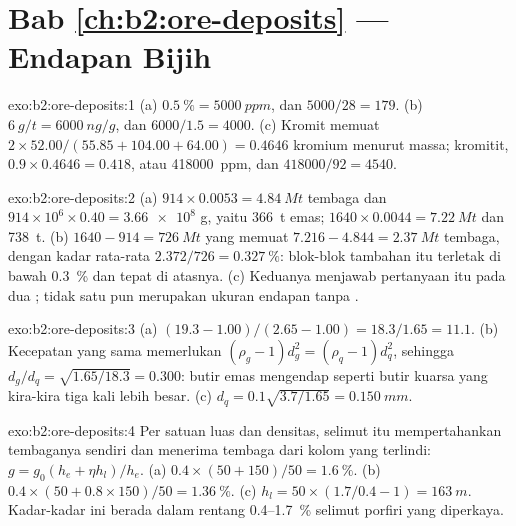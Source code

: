 \section*{Bab \ref{ch:b2:ore-deposits} --- Endapan Bijih}

\begin{solution}{exo:b2:ore-deposits:1}
(a) $\qty{0.5}{\percent} = \qty{5000}{ppm}$, dan $5000/28 = 179$. (b) $\qty{6}{g/t} = \qty{6000}{ng/g}$,
dan $6000/1.5 = 4000$. (c) Kromit memuat $2 \times 52.00/(55.85 + 104.00 + 64.00) = 0.4646$
kromium menurut massa; kromitit, $0.9 \times 0.4646 = 0.418$, atau \qty{418000}{ppm}, dan
$418000/92 = 4540$.
\end{solution}

\begin{solution}{exo:b2:ore-deposits:2}
(a) $914 \times 0.0053 = \qty{4.84}{Mt}$ tembaga dan $914 \times 10^6 \times 0.40 = \num{3.66e8}$ g,
yaitu \qty{366}{t} emas; $1640 \times 0.0044 = \qty{7.22}{Mt}$ dan \qty{738}{t}. (b) $1640 - 914 =
\qty{726}{Mt}$ yang memuat $7.216 - 4.844 = \qty{2.37}{Mt}$ tembaga, dengan kadar rata-rata
$2.372/726 = \qty{0.327}{\percent}$: blok-blok tambahan itu terletak di bawah  \qty{0.3}{\percent}
dan tepat di atasnya. (c) Keduanya menjawab pertanyaan itu pada dua ; tidak satu pun merupakan ukuran
endapan tanpa .
\end{solution}

\begin{solution}{exo:b2:ore-deposits:3}
(a) $(19.3 - 1.00)/(2.65 - 1.00) = 18.3/1.65 = 11.1$. (b) Kecepatan yang sama memerlukan $(\rho_g - 1)d_g^2 =
(\rho_q - 1)d_q^2$, sehingga $d_g/d_q = \sqrt{1.65/18.3} = 0.300$: butir emas mengendap seperti butir kuarsa
yang kira-kira tiga kali lebih besar. (c) $d_q = 0.1\sqrt{3.7/1.65} = \qty{0.150}{mm}$.
\end{solution}

\begin{solution}{exo:b2:ore-deposits:4}
Per satuan luas dan densitas, selimut itu mempertahankan tembaganya sendiri dan menerima tembaga dari kolom
yang terlindi: $g = g_0(h_e + \eta h_l)/h_e$. (a) $0.4 \times (50 + 150)/50 = \qty{1.6}{\percent}$.
(b) $0.4 \times (50 + 0.8 \times 150)/50 = \qty{1.36}{\percent}$. (c) $h_l = 50 \times (1.7/0.4 - 1)
= \qty{163}{m}$. Kadar-kadar ini berada dalam rentang 0.4--\qty{1.7}{\percent} selimut porfiri
yang diperkaya.
\end{solution}

